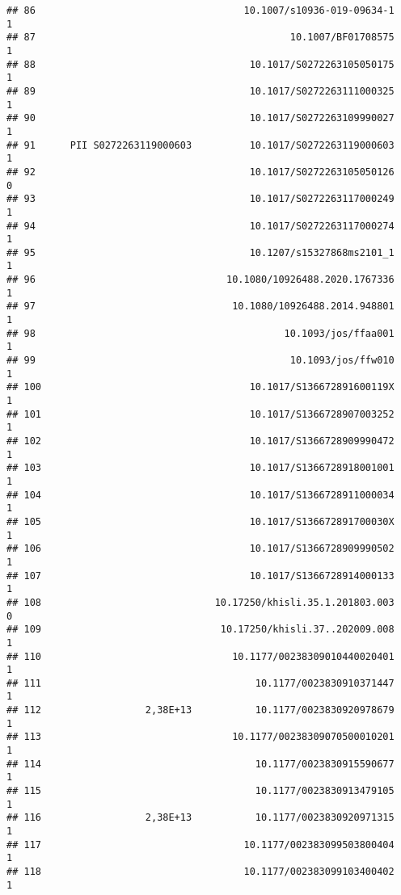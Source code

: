 \documentclass[
  english,
  man]{apa6}
\begin{document}
\begin{verbatim}
## 86                                    10.1007/s10936-019-09634-1            1
## 87                                            10.1007/BF01708575            1
## 88                                     10.1017/S0272263105050175            1
## 89                                     10.1017/S0272263111000325            1
## 90                                     10.1017/S0272263109990027            1
## 91      PII S0272263119000603          10.1017/S0272263119000603            1
## 92                                     10.1017/S0272263105050126            0
## 93                                     10.1017/S0272263117000249            1
## 94                                     10.1017/S0272263117000274            1
## 95                                     10.1207/s15327868ms2101_1            1
## 96                                 10.1080/10926488.2020.1767336            1
## 97                                  10.1080/10926488.2014.948801            1
## 98                                           10.1093/jos/ffaa001            1
## 99                                            10.1093/jos/ffw010            1
## 100                                    10.1017/S136672891600119X            1
## 101                                    10.1017/S1366728907003252            1
## 102                                    10.1017/S1366728909990472            1
## 103                                    10.1017/S1366728918001001            1
## 104                                    10.1017/S1366728911000034            1
## 105                                    10.1017/S136672891700030X            1
## 106                                    10.1017/S1366728909990502            1
## 107                                    10.1017/S1366728914000133            1
## 108                              10.17250/khisli.35.1.201803.003            0
## 109                               10.17250/khisli.37..202009.008            1
## 110                                 10.1177/00238309010440020401            1
## 111                                     10.1177/0023830910371447            1
## 112                  2,38E+13           10.1177/0023830920978679            1
## 113                                 10.1177/00238309070500010201            1
## 114                                     10.1177/0023830915590677            1
## 115                                     10.1177/0023830913479105            1
## 116                  2,38E+13           10.1177/0023830920971315            1
## 117                                   10.1177/002383099503800404            1
## 118                                   10.1177/002383099103400402            1

\end{verbatim}
\end{document}
